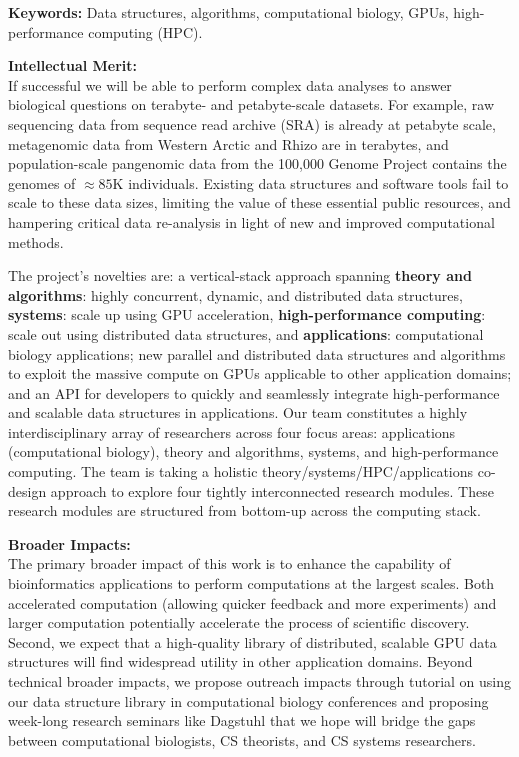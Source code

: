 \noindent \textbf{\large Keywords:} Data structures, algorithms, computational biology, GPUs, high-performance computing (HPC).

\noindent \textbf{\large Intellectual Merit:}\\
If successful we will be able to perform complex data analyses to answer biological questions on terabyte- and petabyte-scale datasets. For example, raw sequencing data from sequence read archive (SRA) is already at petabyte scale, metagenomic data from Western Arctic and Rhizo are in terabytes, and population-scale pangenomic data from the 100,000 Genome Project contains the genomes of $\approx85$K individuals. Existing data structures and software tools fail to scale to these data sizes, limiting the value of these essential public resources, and hampering critical data re-analysis in light of new and improved computational methods.

The project’s novelties are: a vertical-stack approach spanning \textbf{theory and algorithms}: highly concurrent, dynamic, and distributed data structures, \textbf{systems}: scale up using GPU acceleration, \textbf{high-performance computing}: scale out using distributed data structures, and \textbf{applications}: computational biology applications; new parallel and distributed data structures and algorithms to exploit the massive compute on GPUs applicable to other application domains; and an API for developers to quickly and seamlessly integrate high-performance and scalable data structures in applications.
%
Our team constitutes a highly interdisciplinary array of researchers across four focus areas: applications (computational biology), theory and algorithms, systems, and high-performance computing. The team is taking a holistic theory/systems/HPC/applications co-design approach to explore four tightly interconnected research modules. These research modules are structured from bottom-up across the computing stack.

\noindent \textbf{\large Broader Impacts: }\\
The primary broader impact of this work is to enhance the capability of bioinformatics applications to perform computations at the largest scales. Both accelerated computation (allowing quicker feedback and more experiments) and larger computation potentially accelerate the process of scientific discovery. Second, we expect that a high-quality library of distributed, scalable GPU data structures will find widespread utility in other application domains.
%
Beyond technical broader impacts, we propose outreach impacts through tutorial on using our data structure library in computational biology conferences and proposing week-long research seminars like Dagstuhl that we hope will bridge the gaps between computational biologists, CS theorists, and CS systems researchers.
